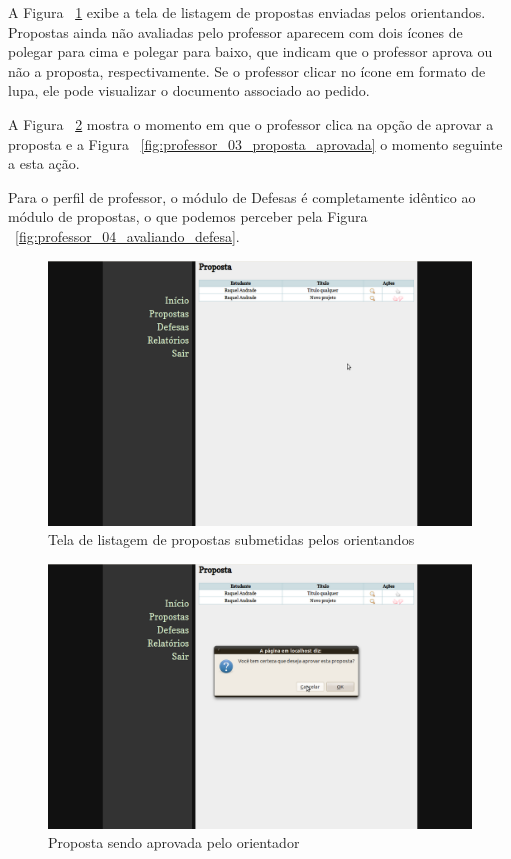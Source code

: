 A Figura ~\ref{fig:professor_01_aprovacao proposta} exibe a tela de listagem de propostas
enviadas pelos orientandos. Propostas ainda não avaliadas pelo professor aparecem com dois ícones
de polegar para cima e polegar para baixo, que indicam que o professor aprova ou não a proposta, respectivamente.
Se o professor clicar no ícone em formato de lupa, ele pode visualizar o documento associado ao pedido.

A Figura ~\ref{fig:professor_02_prosta_sendo_aprovada} mostra o momento em que o professor
clica na opção de aprovar a proposta e a Figura ~\ref{fig:professor_03_proposta_aprovada} o momento
seguinte a esta ação.

Para o perfil de professor, o módulo de Defesas é completamente idêntico ao módulo de propostas, o que
podemos perceber pela Figura ~\ref{fig:professor_04_avaliando_defesa}.

\begin{figure}[htbp]
\centering
\includegraphics[width=1\textwidth]{fig/telas/processo/professor_01_aprovacao proposta.png}
\caption{Tela de listagem de propostas submetidas pelos orientandos}
\label{fig:professor_01_aprovacao proposta}
\end{figure}

\begin{figure}[htbp]
\centering
\includegraphics[width=1\textwidth]{fig/telas/processo/professor_02_prosta_sendo_aprovada.png}
\caption{Proposta sendo aprovada pelo orientador}
\label{fig:professor_02_prosta_sendo_aprovada}
\end{figure}

